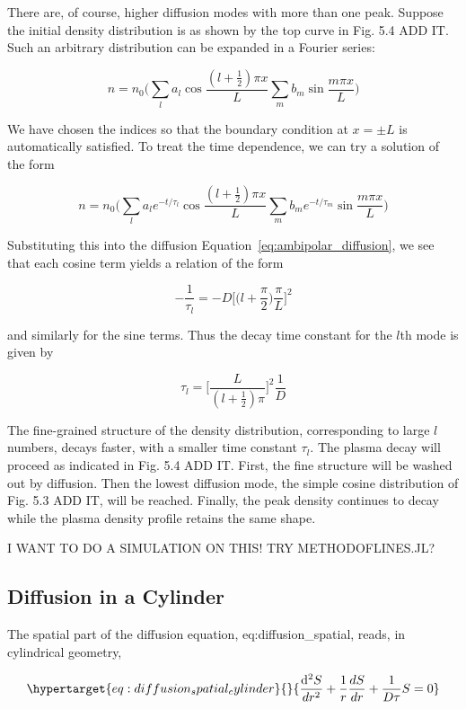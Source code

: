 \documentclass[
  notoc %
]{tufte-book}
\begin{document}
There are, of course, higher diffusion modes with more than one peak.
Suppose the initial density distribution is as shown by the top curve in
Fig. 5.4 ADD IT. Such an arbitrary distribution can be expanded in a
Fourier series:

\[
n = n_0 \Big( \sum_l a_l\cos\frac{(l+\frac{1}{2})\pi x}{L} \sum_m b_m\sin\frac{m\pi x}{L} \Big)
\]

We have chosen the indices so that the boundary condition at \(x=\pm L\)
is automatically satisfied. To treat the time dependence, we can try a
solution of the form

\[
n = n_0 \Big( \sum_l a_l e^{-t/\tau_l}\cos\frac{(l+\frac{1}{2})\pi x}{L} \sum_m b_m e^{-t/\tau_m}\sin\frac{m\pi x}{L} \Big)
\]

Substituting this into the diffusion
Equation~\ref{eq:ambipolar_diffusion}, we see that each cosine term
yields a relation of the form

\[
-\frac{1}{\tau_l} = -D\Big[ \Big(l+\frac{\pi}{2}\Big)\frac{\pi}{L} \Big]^2
\]

and similarly for the sine terms. Thus the decay time constant for the
\(l\)th mode is given by

\[
\tau_l = \Big[ \frac{L}{(l+\frac{1}{2})\pi} \Big]^2 \frac{1}{D}
\]

The fine-grained structure of the density distribution, corresponding to
large \(l\) numbers, decays faster, with a smaller time constant
\(\tau_l\). The plasma decay will proceed as indicated in Fig. 5.4 ADD
IT. First, the fine structure will be washed out by diffusion. Then the
lowest diffusion mode, the simple cosine distribution of Fig. 5.3 ADD
IT, will be reached. Finally, the peak density continues to decay while
the plasma density profile retains the same shape.

I WANT TO DO A SIMULATION ON THIS! TRY METHODOFLINES.JL?

\hypertarget{diffusion-in-a-cylinder}{%
\subsection{Diffusion in a Cylinder}\label{diffusion-in-a-cylinder}}

The spatial part of the diffusion equation, eq:diffusion\_spatial,
reads, in cylindrical geometry,

\begin{equation}\protect\hypertarget{eq:diffusion_spatial_cylinder}{}{
\frac{\mathrm{d}^2 S}{dr^2} + \frac{1}{r}\frac{dS}{dr} + \frac{1}{D\tau}S = 0
}\label{eq:diffusion_spatial_cylinder}\end{equation}
\end{document}
